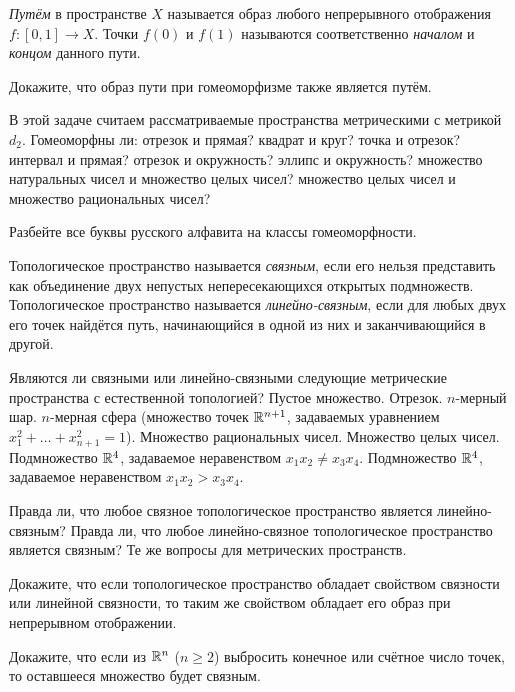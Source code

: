 \documentclass[a4paper,12pt]{article}
\begin{document}
    \emph{Путём} в пространстве $X$ называется образ любого непрерывного отображения $f\colon [0,1] \to X$. Точки $f(0)$ и $f(1)$ называются соответственно \emph{началом} и \emph{концом} данного пути.

    Докажите, что образ пути при гомеоморфизме также является путём.

    В этой задаче считаем рассматриваемые пространства метрическими с метрикой $d_2$. Гомеоморфны ли:
     отрезок и прямая?
     квадрат и круг?
     точка и отрезок?
     интервал и прямая?
     отрезок и окружность?
     эллипс и окружность?
     множество натуральных чисел и множество целых чисел?
     множество целых чисел и множество рациональных чисел?

    Разбейте все буквы русского алфавита на классы гомеоморфности.

\vfill
{}
\newpage

    Топологическое пространство называется \emph{связным}, если его нельзя представить как объединение двух непустых непересекающихся открытых подмножеств. Топологическое пространство называется \emph{линейно-связным}, если для любых двух его точек найдётся путь, начинающийся в одной из них и заканчивающийся в другой.

    Являются ли связными или линейно-связными следующие метрические пространства с естественной топологией?
     Пустое множество.
     Отрезок.
     $n$-мерный шар.
     $n$-мерная сфера (множество точек $\mathbb{R}^{n+1}$, задаваемых уравнением $x_1^2 + \dots + x_{n+1}^2 = 1$).
     Множество рациональных чисел.
     Множество целых чисел.
     Подмножество $\mathbb{R}^4$, задаваемое неравенством $x_1x_2 \neq x_3x_4$.
     Подмножество $\mathbb{R}^4$, задаваемое неравенством $x_1x_2 > x_3x_4$.

    Правда ли, что любое связное топологическое пространство является линейно-связным?
    Правда ли, что любое линейно-связное топологическое пространство является связным?
    Те же вопросы для метрических пространств.

    Докажите, что если топологическое пространство обладает свойством связности или линейной связности, то таким же свойством обладает его образ при непрерывном отображении.

    Докажите, что если из $\mathbb{R}^n$ ($n \ge 2$) выбросить конечное или счётное число точек, то оставшееся множество будет связным.
\end{document}

